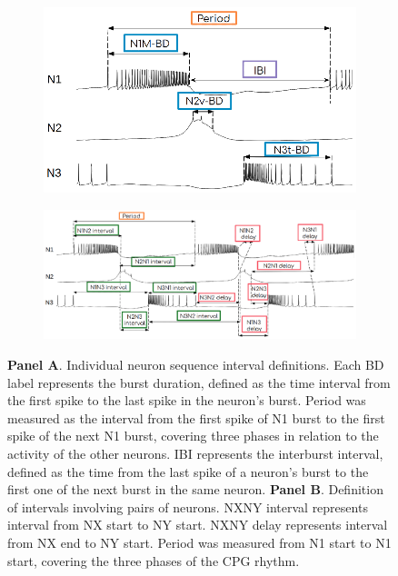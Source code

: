 \begin{figure}
\centering
\begin{subfigure}[t]{\textwidth}
\centering
\includegraphics[scale=0.8]{img/methods-paper-modelo/figure4a.eps} 
\caption{} \label{fig:intervals_bd}
\end{subfigure}

    \vspace{1cm}
\begin{subfigure}[t]{\textwidth}
\centering
\includegraphics[scale=0.8]{img/methods-paper-modelo/figure4b.eps} 
\caption{} \label{fig:intervals_der}
\end{subfigure}
 
 \caption{\textbf{Panel A}. Individual neuron sequence interval definitions. Each BD label represents the burst duration, defined as the time interval from the first spike to the last spike in the neuron's burst. Period was measured as the interval from the first spike of N1 burst to the first spike of the next N1 burst, covering three phases %
 in relation to the activity of the other neurons. IBI represents the interburst interval, defined as the time from the last spike of a neuron's burst to the first one of the next burst in the same neuron.
    \textbf{Panel B}. Definition of intervals involving pairs of neurons. NXNY interval represents interval from NX start to NY start. NXNY delay represents interval from NX end to NY start. Period was measured from N1 start to N1 start, covering the three phases of the CPG rhythm.
    }
    
    \label{fig:intervals}
\end{figure}

